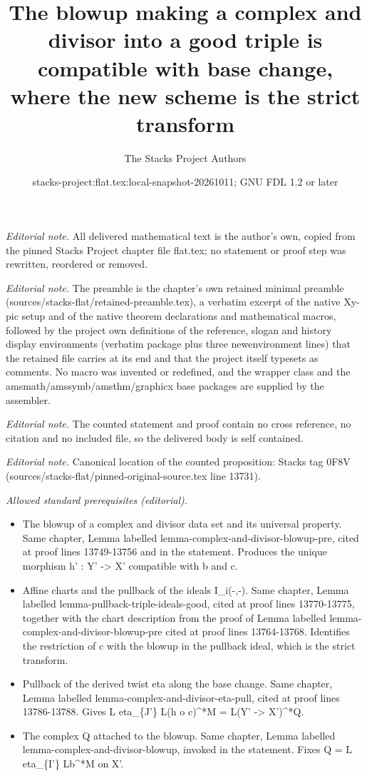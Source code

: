 \documentclass[10pt,a4paper]{amsart}
\title{The blowup making a complex and divisor into a good triple is compatible with base change, where the new scheme is the strict transform}
\author{The Stacks Project Authors}
\date{stacks-project:flat.tex:local-snapshot-20261011; GNU FDL 1.2 or later}
\theoremstyle{plain}
\theoremstyle{definition}
\theoremstyle{remark}
\numberwithin{equation}{subsection}
\begin{document}
\maketitle
\noindent\textit{Editorial note.} All delivered mathematical text is the author's own, copied from the pinned Stacks Project chapter file flat.tex; no statement or proof step was rewritten, reordered or removed.\par\medskip
\noindent\textit{Editorial note.} The preamble is the chapter's own retained minimal preamble (sources/stacks-flat/retained-preamble.tex), a verbatim excerpt of the native Xy-pic setup and of the native theorem declarations and mathematical macros, followed by the project own definitions of the reference, slogan and history display environments (verbatim package plus three newenvironment lines) that the retained file carries at its end and that the project itself typesets as comments. No macro was invented or redefined, and the wrapper class and the amsmath/amssymb/amsthm/graphicx base packages are supplied by the assembler.\par\medskip
\noindent\textit{Editorial note.} The counted statement and proof contain no cross reference, no citation and no included file, so the delivered body is self contained.\par\medskip
\noindent\textit{Editorial note.} Canonical location of the counted proposition: Stacks tag 0F8V (sources/stacks-flat/pinned-original-source.tex line 13731).\par\medskip
\noindent\textit{Allowed standard prerequisites (editorial).}\begin{itemize}
\item The blowup of a complex and divisor data set and its universal property. Same chapter, Lemma labelled lemma-complex-and-divisor-blowup-pre, cited at proof lines 13749-13756 and in the statement. Produces the unique morphism h' : Y' -> X' compatible with b and c.
\item Affine charts and the pullback of the ideals I\_i(-,-). Same chapter, Lemma labelled lemma-pullback-triple-ideals-good, cited at proof lines 13770-13775, together with the chart description from the proof of Lemma labelled lemma-complex-and-divisor-blowup-pre cited at proof lines 13764-13768. Identifies the restriction of c with the blowup in the pullback ideal, which is the strict transform.
\item Pullback of the derived twist eta along the base change. Same chapter, Lemma labelled lemma-complex-and-divisor-eta-pull, cited at proof lines 13786-13788. Gives L eta\_\{J'\} L(h o c)\textasciicircum{}*M = L(Y' -> X')\textasciicircum{}*Q.
\item The complex Q attached to the blowup. Same chapter, Lemma labelled lemma-complex-and-divisor-blowup, invoked in the statement. Fixes Q = L eta\_\{I'\} Lb\textasciicircum{}*M on X'.
\end{itemize}\medskip
\end{document}
